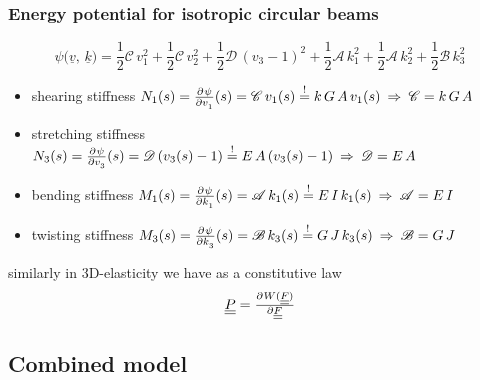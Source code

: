 \begin{frame}
  \frametitle{Energy potential for isotropic circular beams}

  \begin{displaymath}
    \psi \bigl( \underline{v}, \, \underline{k} \bigr) =
    \frac{1}{2} \mathscr{C} \, v_1^2 +
    \frac{1}{2} \mathscr{C} \, v_2^2 +
    \frac{1}{2} \mathscr{D} \, (v_3-1)^2 +
    \frac{1}{2} \mathscr{A} \, k_1^2 +
    \frac{1}{2} \mathscr{A} \, k_2^2 +
    \frac{1}{2} \mathscr{B} \, k_3^2
  \end{displaymath}
  
  \vspace{0.5em}
  \begin{itemize}
    \item shearing stiffness \newline
      $N_1(s) = \pd{\psi}{v_1}(s) = \mathscr{C} \, v_1(s) \overset{!}{=} k \, G \, A \, v_1(s)
      \: \Rightarrow \:
      \mathscr{C} = k \, G \, A$
      
    \item stretching stiffness \newline
      $N_3(s) = \pd{\psi}{v_3}(s) = \mathscr{D} \, (v_3(s) -1) \overset{!}{=} E \, A \, ( v_3(s) -1)
      \: \Rightarrow \:
      \mathscr{D} = E \, A$
      
    \item bending stiffness \newline
      $M_1(s) = \pd{\psi}{k_1}(s) = \mathscr{A} \, k_1(s) \overset{!}{=} E \, I \, k_1(s)
      \: \Rightarrow \:
      \mathscr{A} = E \, I$
      
    \item twisting stiffness \newline
      $M_3(s) = \pd{\psi}{k_3}(s) = \mathscr{B} \, k_3(s) \overset{!}{=} G \, J \, k_3(s)
      \: \Rightarrow \:
      \mathscr{B} = G \, J$
  \end{itemize}
  
  \vspace{1em}
  similarly in 3D-elasticity we have as a constitutive law
  \begin{displaymath}
    \doubleunderline{P} = \pd{W(\doubleunderline{F})}{\doubleunderline{F}}
  \end{displaymath}
\end{frame}


\subsection{Combined model}

